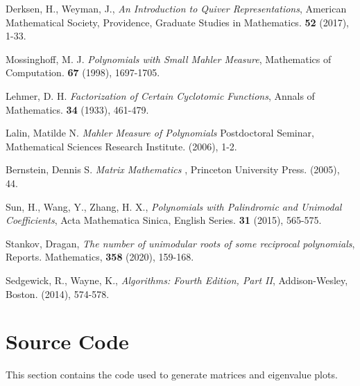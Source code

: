 \documentclass{amsart}
\theoremstyle{theorem}
\theoremstyle{theorem*}
\theoremstyle{definition}
\begin{document}
\begin{thebibliography}{99}

     Derksen, H., Weyman, J., {\em An Introduction to Quiver
            Representations\/}, American Mathematical Society, Providence,
    Graduate Studies in Mathematics. {\bf 52} (2017), 1-33.

     Mossinghoff, M. J. {\em Polynomials with Small Mahler
            Measure\/}, Mathematics of Computation. {\bf 67} (1998), 1697-1705.

     Lehmer, D. H. {\em Factorization of Certain Cyclotomic
            Functions\/}, Annals of Mathematics. {\bf 34} (1933), 461-479.

     Lalin, Matilde N. {\em Mahler Measure of Polynomials\/}
    Postdoctoral Seminar, Mathematical Sciences Research Institute. (2006), 1-2.

     Bernstein, Dennis S. {\em Matrix Mathematics \/},
    Princeton University Press. (2005), 44.

     Sun, H., Wang, Y., Zhang, H. X., {\em Polynomials with
    Palindromic and Unimodal Coefficients}, Acta Mathematica Sinica, English
    Series. {\bf 31} (2015), 565-575.

     Stankov, Dragan, {\em The number of unimodular roots of some
    reciprocal polynomials}, Reports. Mathematics, {\bf 358} (2020), 159-168.

     Sedgewick, R., Wayne, K., {\em Algorithms: Fourth Edition,
            Part II\/}, Addison-Wesley, Boston. (2014), 574-578.
            
\end{thebibliography}
\pagebreak

\appendix

\section{Source Code}

This section contains the code used to generate matrices and eigenvalue plots.

\tiny

\end{document}

